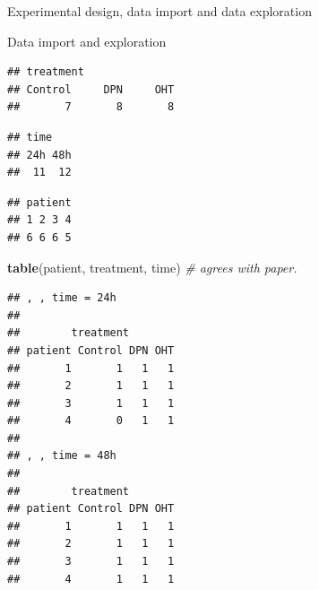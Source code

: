 \documentclass[ignorenonframetext,]{beamer}
\newenvironment{Shaded}{\begin{snugshade}}{\end{snugshade}}
\newcommand{\CommentTok}[1]{\textcolor[rgb]{0.56,0.35,0.01}{\textit{#1}}}
\newcommand{\KeywordTok}[1]{\textcolor[rgb]{0.13,0.29,0.53}{\textbf{#1}}}
\newcommand{\NormalTok}[1]{#1}
\newcommand{\OperatorTok}[1]{\textcolor[rgb]{0.81,0.36,0.00}{\textbf{#1}}}
\newcommand{\StringTok}[1]{\textcolor[rgb]{0.31,0.60,0.02}{#1}}
\begin{document}
\begin{frame}[fragile]{Experimental design, data import and data
exploration}
\begin{block}{Data import and exploration}
\begin{Shaded}
\end{Shaded}

\begin{verbatim}
## treatment
## Control     DPN     OHT 
##       7       8       8
\end{verbatim}

\begin{Shaded}
\end{Shaded}

\begin{verbatim}
## time
## 24h 48h 
##  11  12
\end{verbatim}

\begin{Shaded}
\end{Shaded}

\begin{verbatim}
## patient
## 1 2 3 4 
## 6 6 6 5
\end{verbatim}

\begin{Shaded}
\begin{Highlighting}[]
\KeywordTok{table}\NormalTok{(patient, treatment, time) }\CommentTok{# agrees with paper.}
\end{Highlighting}
\end{Shaded}

\begin{verbatim}
## , , time = 24h
## 
##        treatment
## patient Control DPN OHT
##       1       1   1   1
##       2       1   1   1
##       3       1   1   1
##       4       0   1   1
## 
## , , time = 48h
## 
##        treatment
## patient Control DPN OHT
##       1       1   1   1
##       2       1   1   1
##       3       1   1   1
##       4       1   1   1
\end{verbatim}


\end{block}
\end{frame}
\end{document}
